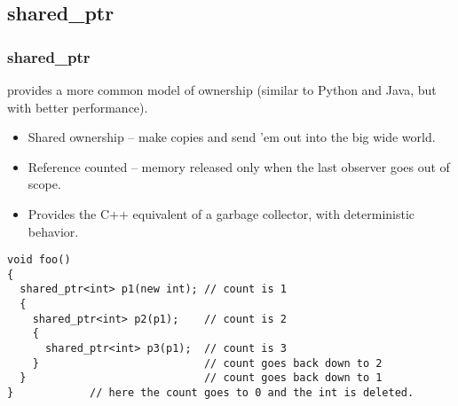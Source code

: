 \subsection{shared\_ptr}


\begin{frame}[fragile]
\frametitle{shared\_ptr}
 provides a more common model of ownership
(similar to Python and Java, but with better performance).

\begin{itemize}
\item Shared ownership -- make copies and send 'em out into the big wide
world.

\item Reference counted -- memory released only when the last observer
goes out of scope.

\item Provides the C++ equivalent of a garbage collector, with
  deterministic behavior.

\end{itemize}

{\scriptsize\begin{verbatim}
void foo() 
{  
  shared_ptr<int> p1(new int); // count is 1
  {
    shared_ptr<int> p2(p1);    // count is 2
    {
      shared_ptr<int> p3(p1);  // count is 3
    }                          // count goes back down to 2
  }                            // count goes back down to 1
}            // here the count goes to 0 and the int is deleted.
\end{verbatim}}

\end{frame}



